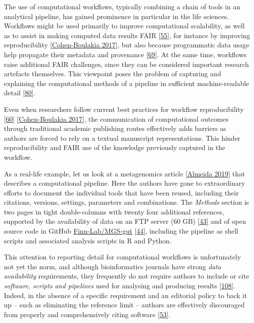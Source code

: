 The use of computational workflows, typically combining a chain of tools
in an analytical pipeline, has gained prominence in particular in the
life sciences. Workflows might be used primarily to improve
computational scalability, as well as to assist in making computed data
results FAIR {[}\href{https://doi.org/10.1162/dint_a_00033}{55}{]}, for
instance by improving reproducibility
{[}\href{https://doi.org/10.1016/j.future.2017.01.012}{Cohen-Boulakia 2017}{]}, but also
because programmatic data usage help propagate their metadata and
provenance {[}\href{https://doi.org/10.1002/cpe.1228}{69}{]}. At the
same time, workflows raise additional FAIR challenges, since they can be
considered important research artefacts themselves. This viewpoint poses
the problem of capturing and explaining the computational methods of a
pipeline in sufficient machine-readable detail
{[}\href{https://doi.org/10.3233/DS-190026}{80}{]}.

Even when researchers follow current best practices for workflow
reproducibility
{[}\href{https://doi.org/10.1016/j.cels.2018.03.014}{60}{]}
{[}\href{https://doi.org/10.1016/j.future.2017.01.012}{Cohen-Boulakia 2017}{]}, the
communication of computational outcomes through traditional academic
publishing routes effectively adds barriers as authors are forced to
rely on a textual manuscript representations. This hinder
reproducibility and FAIR use of the knowledge previously captured in the
workflow.

As a real-life example, let us look at a metagenomics article
{[}\href{https://doi.org/10.1038/s41586-019-0965-1}{Almeida 2019}{]} that describes
a computational pipeline. Here the authors have gone to extraordinary
efforts to document the individual tools that have been reused,
including their citations, versions, settings, parameters and
combinations. The \emph{Methods} section is two pages in tight
double-columns with twenty four additional references, supported by the
availability of data on an FTP server (60 GB)
\href{http://ftp.ebi.ac.uk/pub/databases/metagenomics/umgs_analyses/}{{[}43{]}}
and of open source code in GitHub
\href{https://github.com/Finn-Lab/MGS-gut}{Finn-Lab/MGS-gut}
\href{https://github.com/Finn-Lab/MGS-gut}{{[}44{]}}, including the
pipeline as shell scripts and associated analysis scripts in R and
Python.

This attention to reporting detail for computational workflows is
unfortunately not yet the norm, and although bioinformatics journals
have strong \emph{data availability} requirements, they frequently do
not require authors to include or cite \emph{software, scripts and
pipelines} used for analysing and producing results
\href{https://twitter.com/soilandreyes/status/1250721245622079488}{{[}108{]}}.
Indeed, in the absence of a specific requirement and an editorial policy
to back it up -- such as eliminating the reference limit -- authors are
effectively discouraged from properly and comprehensively citing
software {[}\href{https://doi.org/10.1038/s41592-019-0350-x}{53}{]}.

